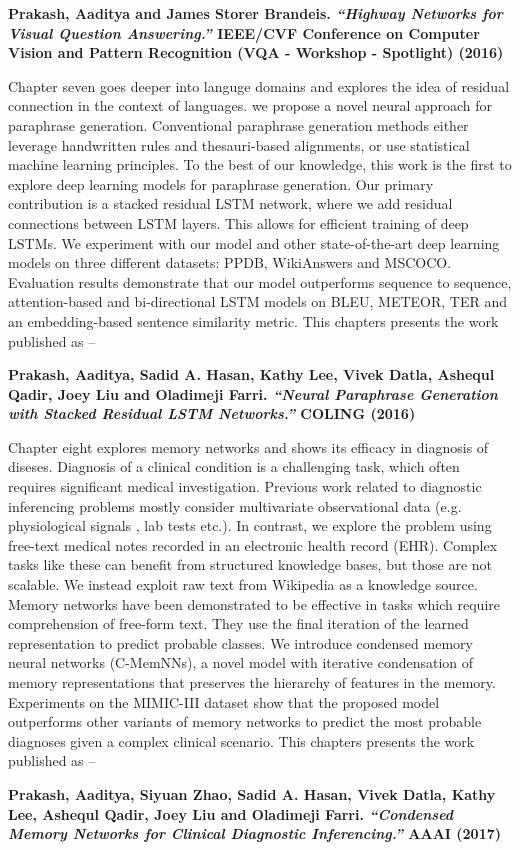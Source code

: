 \noindent\textbf{
Prakash, Aaditya and James Storer Brandeis. \textit{``Highway Networks for Visual Question Answering.''} IEEE/CVF Conference on Computer Vision and Pattern Recognition (VQA - Workshop - Spotlight) (2016)
}
\vspace{2em}

Chapter seven goes deeper into languge domains and explores the idea of residual connection in the context of languages.
we propose a novel neural approach for paraphrase generation. Conventional paraphrase generation methods either leverage handwritten rules and thesauri-based alignments, or use statistical machine learning principles. To the best of our knowledge, this work is the first to explore deep learning models for paraphrase generation. Our primary contribution is a stacked residual LSTM network, where we add residual connections between LSTM layers. This allows for efficient training of deep LSTMs. We experiment with our model and other state-of-the-art deep learning models on three different datasets: PPDB, WikiAnswers and MSCOCO. Evaluation results demonstrate that our model outperforms sequence to sequence, attention-based and bi-directional LSTM models on BLEU, METEOR, TER and an embedding-based sentence similarity metric.
This chapters presents the work published as --

\noindent\textbf{
Prakash, Aaditya, Sadid A. Hasan, Kathy Lee, Vivek Datla, Ashequl Qadir, Joey Liu and Oladimeji Farri. \textit{``Neural Paraphrase Generation with Stacked Residual LSTM Networks.''} COLING (2016) 
}
\vspace{2em}


Chapter eight explores memory networks and shows its efficacy in diagnosis of diseses.
Diagnosis of a clinical condition is a challenging task, which often requires significant medical investigation. Previous work related to diagnostic inferencing problems mostly consider multivariate observational data (e.g. physiological signals , lab tests etc.). In contrast, we explore the problem using free-text medical notes recorded in an electronic health record (EHR). Complex tasks like these can benefit from structured knowledge bases, but those are not scalable. We instead exploit raw text from Wikipedia as a knowledge source. Memory networks have been demonstrated to be effective in tasks which require comprehension of free-form text. They use the final iteration of the learned representation to predict probable classes. We introduce condensed memory neural networks (C-MemNNs), a novel model with iterative condensation of memory representations that preserves the hierarchy of features in the memory. Experiments on the MIMIC-III dataset show that the proposed model outperforms other variants of memory networks to predict the most probable diagnoses given a complex clinical scenario.
This chapters presents the work published as --

\noindent\textbf{
Prakash, Aaditya, Siyuan Zhao, Sadid A. Hasan, Vivek Datla, Kathy Lee, Ashequl Qadir, Joey Liu and Oladimeji Farri. \textit{``Condensed Memory Networks for Clinical Diagnostic Inferencing.''} AAAI (2017)
}
\vspace{2em}
